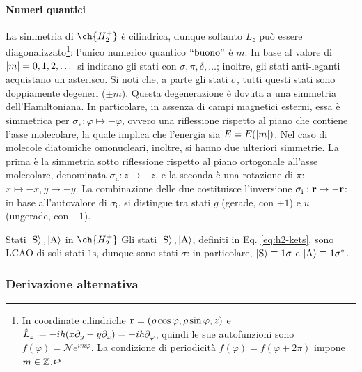 \paragraph{Numeri quantici}

La simmetria di $ \ch{H_2^+} $ è cilindrica, dunque soltanto $ L_z $ può essere diagonalizzato\footnote{In coordinate cilindriche $ \mathbf{r} = (\rho \cos \varphi, \rho \sin \varphi, z) $ e $ \hat{L}_z \defeq -i\hbar (x \pa_y - y \pa_x) = -i \hbar \pa_\varphi $, quindi le sue autofunzioni sono $ f(\varphi) = \mathcal{N} e^{i m \varphi} $. La condizione di periodicità $ f(\varphi) = f(\varphi + 2\pi) $ impone $ m \in \mathbb{Z} $.}: l'unico numerico quantico $ ``\text{buono}" $ è $ m $. In base al valore di $ \left\lvert m\right\rvert = 0, 1, 2, \dots $ si indicano gli stati con $ \sigma, \pi, \delta, \dots $; inoltre, gli stati anti-leganti acquistano un asterisco. Si noti che, a parte gli stati $ \sigma $, tutti questi stati sono doppiamente degeneri ($ \pm m $). Questa degenerazione è dovuta a una simmetria dell'Hamiltoniana. In particolare, in assenza di campi magnetici esterni, essa è simmetrica per $ \sigma_\text{v} : \varphi \mapsto -\varphi $, ovvero una riflessione rispetto al piano che contiene l'asse molecolare, la quale implica che l'energia sia $ E = E(\left\lvert m\right\rvert) $. Nel caso di molecole diatomiche omonucleari, inoltre, si hanno due ulteriori simmetrie. La prima è la simmetria sotto riflessione rispetto al piano ortogonale all'asse molecolare, denominata $\sigma_\text{n}: z \mapsto -z$, e la seconda è una rotazione di $\pi$: $x \mapsto -x, y \mapsto -y$. La combinazione delle due costituisce l'inversione $ \sigma_\text{i} : \mathbf{r} \mapsto -\mathbf{r}$: in base all'autovalore di $ \sigma_\text{i} $, si distingue tra stati $ g $ (gerade, con $ +1 $) e $ u $ (ungerade, con $ -1 $).

\begin{example}{Stati $ \ket{\text{S}},\ket{\text{A}} $ in $ \ch{H_2^+} $}{}
	Gli stati $ \ket{\text{S}},\ket{\text{A}} $, definiti in Eq. \ref{eq:h2-kets}, sono LCAO di soli stati $ \text{1s} $, dunque sono stati $ \sigma $: in particolare, $ \ket{\text{S}} \equiv 1\sigma $ e $ \ket{\text{A}} \equiv 1\sigma^* $.
\end{example}



\subsubsection{Derivazione alternativa}

